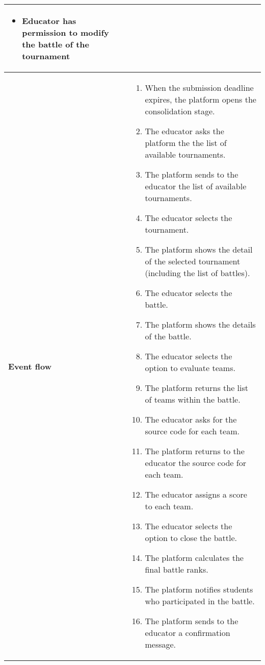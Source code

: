 \begin{enumerate}[label=\textbf{UC\arabic*}:,ref=UC\arabic*,leftmargin=1.3cm]
{\begin{table}[H]
\begin{tabular}{|l|p{11.9cm}|}
\begin{itemize}
                              \item Educator has permission to modify the battle of the tournament
                        \end{itemize}                                            \\\hline
                        \textbf{Event flow}      &
                        \begin{enumerate}[label=\arabic*.]
                              \item When the submission deadline expires, the platform opens the consolidation stage.
                              \item The educator asks the platform the the list of available tournaments.
                              \item The platform sends to the educator the list of available tournaments.
                              \item The educator selects the tournament.
                              \item The platform shows the detail of the selected tournament (including the list of battles).
                              \item The educator selects the battle.
                              \item The platform shows the details of the battle.
                              \item The educator selects the option to evaluate teams.
                              \item The platform returns the list of teams within the battle.
                              \item The educator asks for the source code for each team.
                              \item The platform returns to the educator the source code for each team.
                              \item The educator assigns a score to each team.
                              \item The educator selects the option to close the battle.
                              \item The platform calculates the final battle ranks.
                              \item The platform notifies students who participated in the battle.
                              \item The platform sends to the educator a confirmation message.
                        \end{enumerate}                 \\\hline

\end{tabular}
\end{table}}
\end{enumerate}
